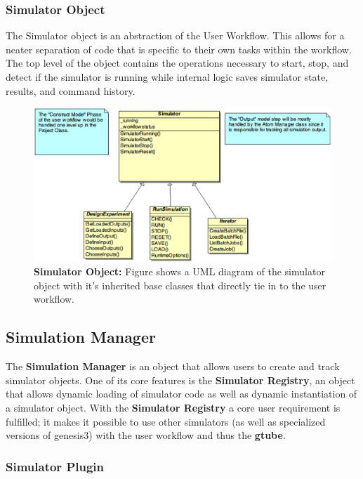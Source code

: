 \documentclass[12pt]{article}
\begin{document}
\subsubsection*{Simulator Object}

	The Simulator object is an abstraction of the User Workflow. This allows for a neater separation of code that is specific to their own tasks within the workflow. The top level of the object contains the operations necessary to start, stop, and detect if the simulator is running while internal logic saves simulator state, results, and command history. 

\begin{figure}[ht]
   \centering
   \includegraphics[scale=0.6]{figures/SimulatorObject.eps}
   \caption{{\bf Simulator Object:} Figure shows a UML diagram of the simulator object with it's inherited base classes that directly tie in to the user workflow.}
   \label{fig:Simulator Object}
\end{figure}


\subsection*{Simulation Manager}

	The {\bf Simulation Manager} is an object that allows users to create and track simulator objects. One of its core features is the {\bf Simulator Registry}, an object that allows dynamic loading of simulator code as well as dynamic instantiation of a simulator object. With the {\bf Simulator Registry} a core user requirement is fulfilled; it makes it possible to use other simulators (as well as specialized versions of genesis3) with the user workflow and thus the {\bf gtube}. 
	
\subsubsection*{Simulator Plugin}
\end{document}
